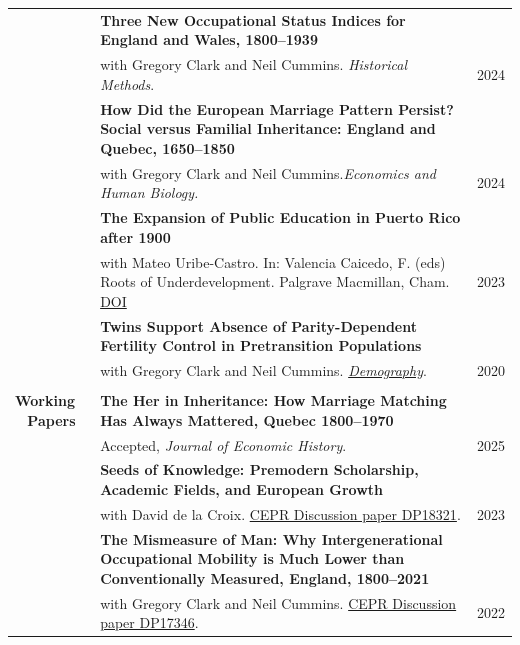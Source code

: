 \documentclass[a4paper,11pt,oneside]{article}
\begin{document}
\begin{longtable}{@{} p{0.175\linewidth} p{0.775\linewidth} p{0.05\linewidth}}
   & \textbf{Three New Occupational Status Indices for England and Wales, 1800--1939}\\ 
   &  with Gregory Clark and Neil Cummins. \emph{Historical Methods}. & \hfill 2024  \\

  
   & \textbf{How Did the European Marriage Pattern Persist? Social versus Familial Inheritance: England and Quebec, 1650--1850 }\\ 
   &   with Gregory Clark and Neil Cummins.\emph{Economics and Human Biology.}  & \hfill 2024 \\


   & \textbf{The Expansion of Public Education in Puerto Rico after 1900} \\
   & with Mateo Uribe-Castro. In: Valencia Caicedo, F. (eds) Roots of Underdevelopment. Palgrave Macmillan, Cham. \href{https://doi.org/10.1007/978-3-031-38723-4_19}{DOI}& \hfill 2023\\

    & \textbf{Twins Support Absence of Parity-Dependent Fertility Control in Pretransition Populations }\\
   &  with Gregory Clark and Neil Cummins. \href{https://read.dukeupress.edu/demography/article/57/4/1571/168109/Twins-Support-the-Absence-of-Parity-Dependent}{\emph{Demography}}. & \hfill 2020\\

 \\
   \textbf{\large{Working \(\phantom{1}\)  Papers}}  
  
  
   
   & \textbf{The Her in Inheritance: How Marriage Matching Has Always Mattered, Quebec 1800--1970}\\ 
   &  Accepted, \emph{Journal of Economic History}. &  \hfill 2025  \\


   & \textbf{Seeds of Knowledge: Premodern Scholarship, Academic Fields, and European Growth }\\ 
   &   with David de la Croix. \href{https://cepr.org/publications/dp18321}{CEPR Discussion paper DP18321}. & 2023 \\
   
   
   & \textbf{The Mismeasure of Man: Why Intergenerational Occupational Mobility  is Much Lower than Conventionally Measured, England, 1800--2021}\\ 
   &  with Gregory Clark and Neil Cummins. \href{hhttps://cepr.org/publications/dp17346}{CEPR Discussion paper DP17346}. & 2022   \\



\end{longtable}
\end{document}
